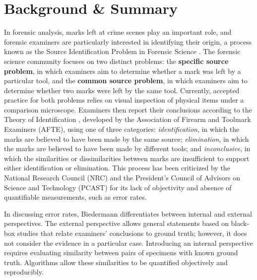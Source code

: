 \documentclass[11pt,a4paper]{article}
\begin{document}
\section*{Background \& Summary}\label{sec-background-summary}

In forensic analysis, marks left at crime scenes play an important role,
and forensic examiners are particularly interested in identifying their
origin, a process known as the Source Identification Problem in Forensic
Science \citep{lindleyProblemForensicScience1977}. The forensic science
community focuses on two distinct problems: the \textbf{specific source
problem}, in which examiners aim to determine whether a mark was left by
a particular tool, and the \textbf{common source problem}, in which
examiners aim to determine whether two marks were left by the same tool.
Currently, accepted practice for both problems relies on visual
inspection of physical items under a comparison microscope. Examiners
then report their conclusions according to the Theory of Identification
\citep{afteAssociationFirearmTool1998}, developed by the Association of
Firearm and Toolmark Examiners (AFTE), using one of three categories:
\emph{identification}, in which the marks are believed to have been made
by the same source; \emph{elimination}, in which the marks are believed
to have been made by different tools; and \emph{inconclusive}, in which
the similarities or dissimilarities between marks are insufficient to
support either identification or elimination. This process has been
criticized by the National Research Council (NRC)
\citep{nationalresearchcouncilu.s.StrengtheningForensicScience2009a} and
the President's Council of Advisors on Science and Technology (PCAST)
\citep{presidentscouncilofadvisorsonscienceandtechnologyForensicScienceCriminal2016}
for its lack of objectivity and absence of quantifiable measurements,
such as error rates.

In discussing error rates, Biedermann
\citep{biedermannStrangePersistenceSource2022} differentiates between
internal and external perspectives. The external perspective allows
general statements based on black-box studies that relate examiners'
conclusions to ground truth; however, it does not consider the evidence
in a particular case. Introducing an internal perspective requires
evaluating similarity between pairs of specimens with known ground
truth. Algorithms allow these similarities to be quantified objectively
and reproducibly.
\end{document}
